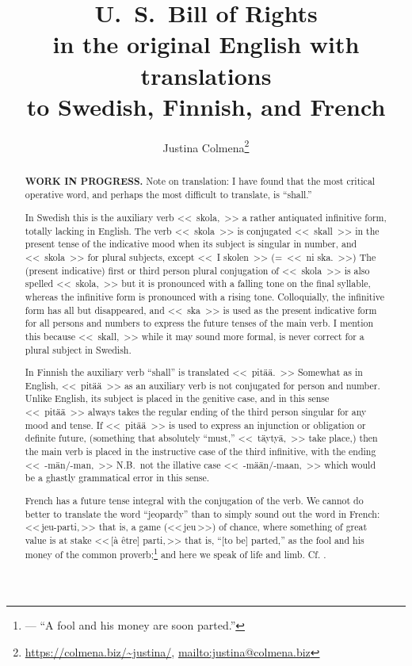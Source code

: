 \documentclass[a4paper,landscape,12pt]{article}
\title{{\huge \textbf{U.~S.\ Bill of Rights}}\\
	in the original English with translations\\
	to Swedish, Finnish, and French}
\author{Justina Colmena\footnote{\url{https://colmena.biz/~justina/}, \url{mailto:justina@colmena.biz}}}
\begin{document}
	
\sloppy\centering
\maketitle
\begin{abstract}
	{\color{red}\textbf{WORK IN PROGRESS.}}  Note on translation:  I have found that the most critical operative word, and perhaps the most difficult to translate, is ``shall.''
	
	In Swedish this is the auxiliary verb \foreignlanguage{swedish}{<<~skola,~>>} a rather antiquated infinitive form, totally lacking in English.  The verb \foreignlanguage{swedish}{<<~skola~>>} is conjugated \foreignlanguage{swedish}{<<~skall~>>} in the present tense of the indicative mood when its subject is singular in number, and \foreignlanguage{swedish}{<<~skola~>>} for plural subjects, except \foreignlanguage{swedish}{<<~I skolen~>> (=~<<~ni ska.~>>)}  The (present indicative) first or third person plural conjugation of \foreignlanguage{swedish}{<<~skola~>>} is also spelled \foreignlanguage{swedish}{<<~skola,~>>} but it is pronounced with a falling tone on the final syllable, whereas the infinitive form is pronounced with a rising tone.  Colloquially, the infinitive form has all but disappeared, and \foreignlanguage{swedish}{<<~ska~>>} is used as the present indicative form for all persons and numbers to express the future tenses of the main verb.  I mention this because \foreignlanguage{swedish}{<<~skall,~>>} while it may sound more formal, is never correct for a plural subject in Swedish.
		
	In Finnish the auxiliary verb ``shall'' is translated \foreignlanguage{finnish}{<<~pitää.~>>}  Somewhat as in English, \foreignlanguage{finnish}{<<~pitää~>>} as an auxiliary verb is not conjugated for person and number.  Unlike English, its subject is placed in the genitive case, and in this sense \foreignlanguage{finnish}{<<~pitää~>>}  always takes the regular ending of the third person singular for any mood and tense.  If \foreignlanguage{finnish}{<<~pitää~>>} is used to express an injunction or obligation or definite future, (something that absolutely ``must,'' \foreignlanguage{finnish}{<<~täytyä,~>>} take place,) then the main verb is placed in the instructive case of the third infinitive, with the ending \foreignlanguage{finnish}{<<~\mbox{-män/-man,}~>>} N.B.\ not the illative case \foreignlanguage{finnish}{<<~\mbox{-mään/-maan,}~>>} which would be a ghastly grammatical error in this sense.

	French has a future tense integral with the conjugation of the verb. We cannot do better to translate the word ``jeopardy'' than to simply sound out the word in French: \foreignlanguage{french}{<<\,jeu-parti,\,>>} that is, a game (\foreignlanguage{french}{<<\,jeu\,>>}) of chance, where something of great value is at stake \foreignlanguage{french}{<<\,[à être] parti,\,>>} that is, ``[to be] parted,'' as the fool and his money of the common proverb;\footnote{--- ``A fool and his money are soon parted.''} and here we speak of life and limb.  Cf{.} \cite{wp-bor-fr,jpfo-bor-fr}.
	

\end{abstract}
\end{document}
